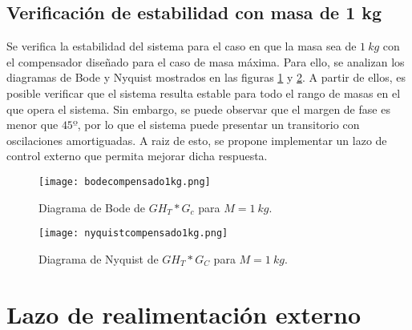 \subsection{Verificación de estabilidad con masa de 1 kg}


\noindent Se verifica la estabilidad del sistema  para el caso en que la masa sea de $1\:kg$ con el compensador dise\~{n}ado para el caso de masa m\'{a}xima. Para ello, se analizan los diagramas de Bode y Nyquist mostrados en las figuras \ref{fig:bode-analog-para-M-1Kg} y \ref{fig:nyquist-analog-para-M-1Kg}. A partir de ellos, es posible verificar que el sistema resulta estable para todo el rango de masas en el que opera el sistema. Sin embargo, se puede observar que el margen de fase es menor que $45º$, por lo que el sistema puede presentar un transitorio con oscilaciones amortiguadas. A raiz de esto, se propone implementar un lazo de control externo que permita mejorar dicha respuesta.

\begin{figure}[H]
	\centering
	\texttt{[image: bodecompensado1kg.png]}
	\caption{Diagrama de Bode de $GH_T*G_c$ para $M=1\:kg$.}
	\label{fig:bode-analog-para-M-1Kg}
\end{figure}

\begin{figure}[H]
	\centering
	\texttt{[image: nyquistcompensado1kg.png]}
	\caption{Diagrama de Nyquist de $GH_T*G_C$ para $M=1\:kg$.}
	\label{fig:nyquist-analog-para-M-1Kg}
\end{figure}




\section{Lazo de realimentación externo}


